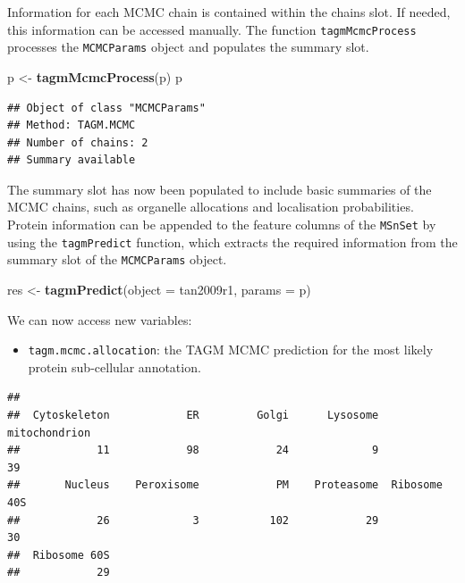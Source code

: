 \documentclass[
]{article}
\newenvironment{Shaded}{\begin{snugshade}}{\end{snugshade}}
\newcommand{\DataTypeTok}[1]{\textcolor[rgb]{0.13,0.29,0.53}{#1}}
\newcommand{\KeywordTok}[1]{\textcolor[rgb]{0.13,0.29,0.53}{\textbf{#1}}}
\newcommand{\NormalTok}[1]{#1}
\newcommand{\OperatorTok}[1]{\textcolor[rgb]{0.81,0.36,0.00}{\textbf{#1}}}
\newcommand{\StringTok}[1]{\textcolor[rgb]{0.31,0.60,0.02}{#1}}
\providecommand{\tightlist}{%
  \setlength{\itemsep}{0pt}\setlength{\parskip}{0pt}}
\begin{document}
Information for each MCMC chain is contained within the chains slot. If
needed, this information can be accessed manually. The function
\texttt{tagmMcmcProcess} processes the \texttt{MCMCParams} object and
populates the summary slot.

\begin{Shaded}
\begin{Highlighting}[]
\NormalTok{p <-}\StringTok{ }\KeywordTok{tagmMcmcProcess}\NormalTok{(p)}
\NormalTok{p}
\end{Highlighting}
\end{Shaded}

\begin{verbatim}
## Object of class "MCMCParams"
## Method: TAGM.MCMC 
## Number of chains: 2 
## Summary available
\end{verbatim}

The summary slot has now been populated to include basic summaries of
the MCMC chains, such as organelle allocations and localisation
probabilities. Protein information can be appended to the feature
columns of the \texttt{MSnSet} by using the \texttt{tagmPredict}
function, which extracts the required information from the summary slot
of the \texttt{MCMCParams} object.

\begin{Shaded}
\begin{Highlighting}[]
\NormalTok{res <-}\StringTok{ }\KeywordTok{tagmPredict}\NormalTok{(}\DataTypeTok{object =}\NormalTok{ tan2009r1, }\DataTypeTok{params =}\NormalTok{ p)}
\end{Highlighting}
\end{Shaded}

We can now access new variables:

\begin{itemize}
\tightlist
\item
  \texttt{tagm.mcmc.allocation}: the TAGM MCMC prediction for the most
  likely protein sub-cellular annotation.
\end{itemize}

\begin{Shaded}
\end{Shaded}

\begin{verbatim}
## 
##  Cytoskeleton            ER         Golgi      Lysosome mitochondrion 
##            11            98            24             9            39 
##       Nucleus    Peroxisome            PM    Proteasome  Ribosome 40S 
##            26             3           102            29            30 
##  Ribosome 60S 
##            29
\end{verbatim}
\end{document}
